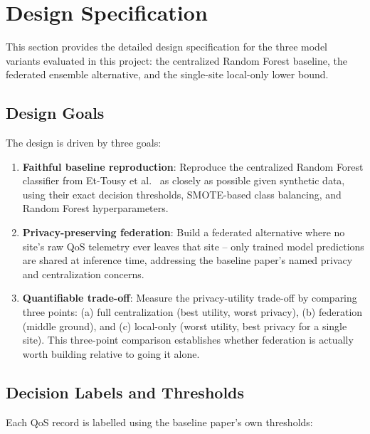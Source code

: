 
\section{Design Specification}
\label{sec:Design}

This section provides the detailed design specification for the three model variants evaluated in this project: the centralized Random Forest baseline, the federated ensemble alternative, and the single-site local-only lower bound.

\subsection{Design Goals}
\label{subsec:design-goals}

The design is driven by three goals:

\begin{enumerate}
  \item \textbf{Faithful baseline reproduction}: Reproduce the centralized Random Forest classifier from Et-Tousy et al.\ \cite{EtTousy26} as closely as possible given synthetic data, using their exact decision thresholds, SMOTE-based class balancing, and Random Forest hyperparameters.
  \item \textbf{Privacy-preserving federation}: Build a federated alternative where no site's raw QoS telemetry ever leaves that site -- only trained model predictions are shared at inference time, addressing the baseline paper's named privacy and centralization concerns.
  \item \textbf{Quantifiable trade-off}: Measure the privacy-utility trade-off by comparing three points: (a) full centralization (best utility, worst privacy), (b) federation (middle ground), and (c) local-only (worst utility, best privacy for a single site). This three-point comparison establishes whether federation is actually worth building relative to going it alone.
\end{enumerate}

\subsection{Decision Labels and Thresholds}
\label{subsec:decision-labels}

Each QoS record is labelled using the baseline paper's own thresholds:


